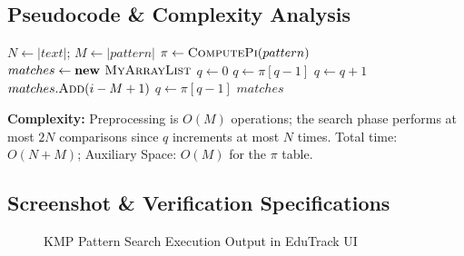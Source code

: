 \subsection{Pseudocode \& Complexity Analysis}
\begin{algorithm}[H]
\caption{KMP String Search with Zero \texttt{java.util.*}}
\begin{algorithmic}[1]
    \State $N \gets |text|$; \quad $M \gets |pattern|$
    \State $\pi \gets \Call{ComputePi}{pattern}$
    \State $matches \gets \textbf{new } \Call{MyArrayList}{}$
    \State $q \gets 0$
            \State $q \gets \pi[q - 1]$
        \EndWhile
         $q \gets q + 1$ \EndIf
            \State $matches.\Call{Add}{i - M + 1}$
            \State $q \gets \pi[q - 1]$
        \EndIf
    \EndFor
    \State \Return $matches$
\EndFunction
\end{algorithmic}
\end{algorithm}
\textbf{Complexity:} Preprocessing is $O(M)$ operations; the search phase performs at most $2N$ comparisons since $q$ increments at most $N$ times. Total time: $O(N + M)$; Auxiliary Space: $O(M)$ for the $\pi$ table.

\subsection{Screenshot \& Verification Specifications}
\begin{figure}[H]
    \centering
    \caption{KMP Pattern Search Execution Output in EduTrack UI}
    \label{fig:screenshot_kmp}
\end{figure}

